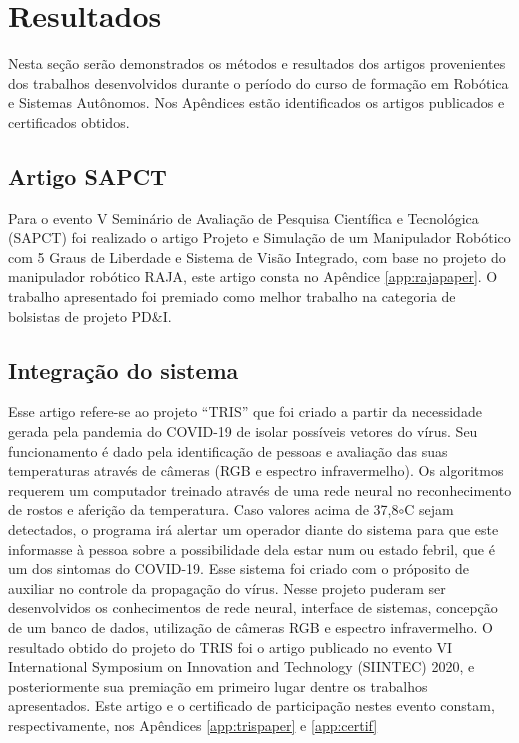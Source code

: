 \chapter{Resultados}
\label{chap:result}

Nesta seção serão demonstrados os métodos e resultados dos artigos provenientes dos
trabalhos desenvolvidos durante o período do curso de formação em Robótica e Sistemas Autônomos. Nos Apêndices estão identificados os artigos publicados e certificados obtidos.

\section{Artigo SAPCT}
\label{sec:artigoRAJA}

Para o evento V Seminário de Avaliação de Pesquisa Científica e Tecnológica (SAPCT)
foi realizado o artigo Projeto e Simulação de um Manipulador Robótico com 5 Graus de
Liberdade e Sistema de Visão Integrado, com base no projeto do manipulador robótico
RAJA, este artigo consta no Apêndice \ref{app:rajapaper}. O trabalho apresentado foi premiado como melhor trabalho na categoria de bolsistas de projeto PD\&I.


\section{Integração do sistema}
\label{sec:artigoTRIS}

Esse artigo refere-se ao projeto ``TRIS'' que foi criado a partir da necessidade gerada pela pandemia do COVID-19 de isolar possíveis vetores do vírus. Seu funcionamento é dado pela identificação de pessoas e avaliação das suas temperaturas através de câmeras (RGB e espectro infravermelho). Os algoritmos requerem um computador treinado através de uma rede neural no reconhecimento de rostos e aferição da temperatura. Caso valores acima de 37,8$\circ$C sejam detectados, o programa irá alertar um operador diante do sistema para que este informasse à pessoa sobre a possibilidade dela estar num ou estado febril, que é um dos sintomas do COVID-19. Esse sistema foi criado com o próposito de auxiliar no controle da propagação do vírus. Nesse projeto puderam ser desenvolvidos os conhecimentos de rede neural, interface de sistemas, concepção de um banco de dados, utilização de câmeras RGB e espectro infravermelho. O resultado obtido do projeto do TRIS foi o artigo publicado no evento VI International Symposium on Innovation and Technology (SIINTEC) 2020, e posteriormente sua premiação em primeiro lugar dentre os trabalhos apresentados. Este artigo e o certificado de participação nestes evento constam, respectivamente, nos Apêndices \ref{app:trispaper} e \ref{app:certif}



